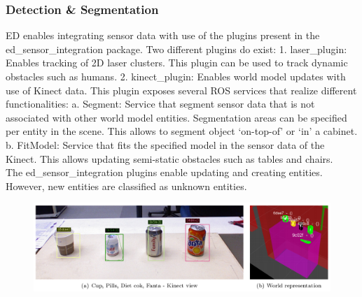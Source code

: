\subsubsection{Detection \& Segmentation}
ED enables integrating sensor data with use of the plugins present in the ed\_sensor\_integration package. Two different plugins do exist:
1. laser\_plugin: Enables tracking of 2D laser clusters. This plugin can be used to track dynamic obstacles such as humans.
2. kinect\_plugin: Enables world model updates with use of Kinect data. This plugin exposes several ROS services that realize different functionalities:
a. Segment: Service that segment sensor data that is not associated with other world model entities. Segmentation areas can be specified per entity in the scene. This allows to segment object ‘on-top-of’ or ‘in’ a cabinet.
b. FitModel: Service that fits the specified model in the sensor data of the Kinect. This allows updating semi-static obstacles such as tables and chairs.
\\
The ed\_sensor\_integration plugins enable updating and creating entities. However, new entities are classified as unknown entities.
\begin{figure}[h]
    \centering
	\includegraphics[width = 0.9\linewidth]{Figures/ed_perception}
    \caption{}
	\label{fig:ed_perception}
\end{figure}

